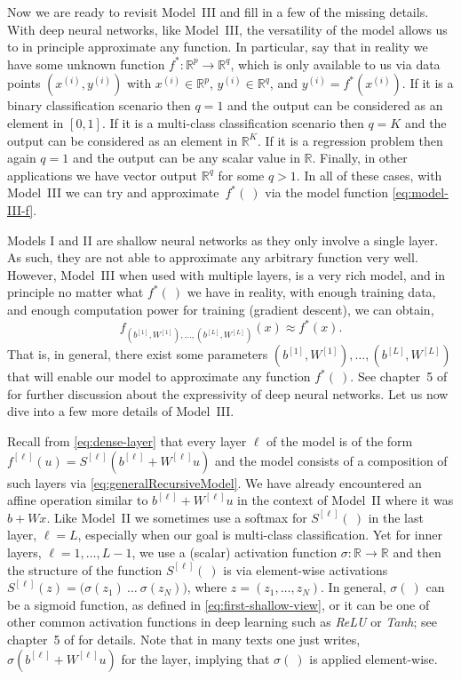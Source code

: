 Now we are ready to revisit Model~III and fill in a few of the missing details. With deep neural networks, like Model~III, the versatility of the model allows us to in principle approximate any function. In particular, say that in reality we have some unknown function $f^*: \mathbb{R}^p \longrightarrow {\mathbb R}^q$, which is only available to us via data points $(x^{(i)}, y^{(i)})$ with $x^{(i)} \in {\mathbb R}^p$, $y^{(i)} \in {\mathbb R}^q$,  and $y^{(i)} = f^*(x^{(i)})$. If it is a binary classification scenario then $q=1$ and the output can be considered as an element in $[0,1]$. If it is a multi-class classification scenario then $q=K$ and the output can be considered as an element in ${\mathbb R}^K$. If it is a regression problem then again $q=1$ and the output can be any scalar value in ${\mathbb R}$. Finally, in other applications we have vector output ${\mathbb R}^q$ for some $q>1$. In all of these cases, with Model~III we can try and approximate~$f^*(~)$  via the model function \eqref{eq:model-III-f}.

Models I and II are shallow neural networks as they only involve a single layer. As such, they are not able to approximate any arbitrary function very well. However, Model~III when used with multiple layers, is a very rich model, and in principle no matter what $f^*(~)$ we have in reality, with enough training data, and enough computation power for training (gradient descent), we can obtain,
%
\begin{equation}
\label{eq:mod3-approx}
f_{(b^{[1]}, W^{[1]}), \ldots, (b^{[L]}, W^{[L]})} (x) \approx f^*(x).
\end{equation}
%
That is, in general, there exist some parameters ${(b^{[1]}, W^{[1]}), \ldots, (b^{[L]}, W^{[L]})}$ that will enable our model to approximate any function $f^*(~)$. See chapter~5 of \cite{LiquetMokaNazarathy2024DeepLearning} for further discussion about the expressivity of deep neural networks. Let us now dive into a few more details of Model~III.

Recall from  \eqref{eq:dense-layer} that every layer $\ell$ of the model is of the form $f^{[\ell]}(u) = S^{[\ell]}(b^{[\ell]} + W^{[\ell]} u)$ and the model consists of a composition of such layers via \eqref{eq:generalRecursiveModel}. We have already encountered an affine operation similar to $b^{[\ell]} + W^{[\ell]} u$ in the context of Model~II where it was $b + Wx$. Like Model~II we sometimes use a softmax for $S^{[\ell]}(~)$ in the last layer, $\ell=L$, especially when our goal is multi-class classification. Yet for inner layers, $\ell = 1,\ldots,L-1$, we use a (scalar) activation function $\sigma: \mathbb R \to \mathbb R$ and then the structure of the function $S^{[\ell]}(~)$ is via element-wise activations $S^{[\ell]}(z) = \big(\sigma\left(z_{1}\right) ~ \ldots ~\sigma\left(z_{N}\right)\big)$, where $z = (z_1, \ldots, z_N)$. In general, $\sigma(~)$ can be a sigmoid function, as defined in \eqref{eq:first-shallow-view}, or it can be one of other common activation functions in deep learning such as {\em ReLU} or {\em Tanh}; see chapter~5 of \cite{LiquetMokaNazarathy2024DeepLearning} for details. Note that in many texts one just writes, $\sigma(b^{[\ell]} + W^{[\ell]} u)$ for the layer, implying that $\sigma(~)$ is applied element-wise.


